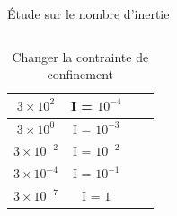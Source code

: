 \documentclass[10pt]{beamer}
\begin{document}
\begin{frame}{Étude sur le nombre d'inertie}
\begin{columns}
\begin{column}{0.5\textwidth}
\begin{table}
\begin{tabular}{|c|c|c|c|}
                    \hline
                    $3 \times 10^2$    & I = $10^{-4}$                       \\
                    \hline
                    $3 \times 10^0$    & I = $10^{-3}$                       \\
                    \hline
                    $3 \times 10^{-2}$ & I = $10^{-2}$                       \\
                    \hline
                    $3 \times 10^{-4}$ & I = $10^{-1}$                       \\
                    \hline
                    $3 \times 10^{-7}$ & I = $1$                             \\
                    \hline
                \end{tabular}
                \caption{Changer la contrainte de confinement}
            \end{table}
        \end{column}
    \end{columns}
\end{frame}
\end{document}
